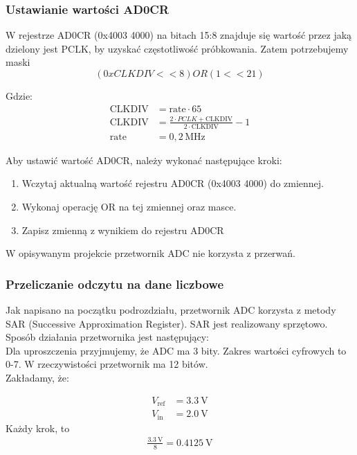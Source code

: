 \subsubsection{Ustawianie wartości AD0CR}
    W rejestrze AD0CR (0x4003 4000) na bitach 15:8 znajduje się wartość przez jaką dzielony jest PCLK, by uzyskać częstotliwość próbkowania.
    Zatem potrzebujemy maski 
    \begin{equation*}
    (0xCLKDIV<<8) OR (1<<21)
    \end{equation*}

    Gdzie:
    \begin{align*}
        \text{CLKDIV} &= \text{rate} \cdot 65 \\
        \text{CLKDIV} &= \frac{2 \cdot PCLK + \text{CLKDIV}}{2 \cdot \text{CLKDIV}} - 1 \\
        \text{rate}   &= 0{,}2\,\text{MHz}
    \end{align*}

    
    Aby ustawić wartość AD0CR, należy wykonać następujące kroki:
    \begin{enumerate}
        \item Wczytaj aktualną wartość rejestru AD0CR (0x4003 4000) do zmiennej.
        \item Wykonaj operację OR na tej zmiennej oraz masce.
        \item Zapisz zmienną z wynikiem do rejestru AD0CR
    \end{enumerate}
    W opisywanym projekcie przetwornik ADC nie korzysta z przerwań.

    \subsubsection{Przeliczanie odczytu na dane liczbowe}
    Jak napisano na początku podrozdziału, przetwornik ADC korzysta z metody SAR (Successive Approximation Register). SAR jest realizowany sprzętowo. Sposób działania przetwornika jest następujący:\\
    Dla uproszczenia przyjmujemy, że ADC ma 3 bity. Zakres wartości cyfrowych to 0-7. W rzeczywistości przetwornik ma 12 bitów.\\
    Zakładamy, że:

    \begin{align*}
        V_{\text{ref}} &= \SI{3.3}{\volt} \\
        V_{\text{in}} &= \SI{2.0}{\volt}
    \end{align*}
    Każdy krok, to 
    \begin{align*}
        \frac{\SI{3.3}{\volt}}{8} = \SI{0.4125}{\volt}
    \end{align*}

